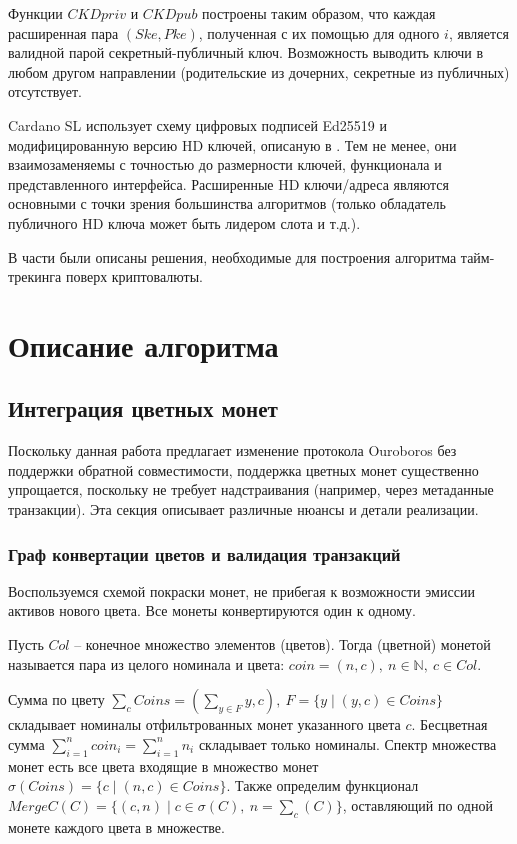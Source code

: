 \documentclass[specification,annotation]{itmo-student-thesis}
\begin{document}
Функции $CKDpriv$ и $CKDpub$ построены таким образом, что каждая
расширенная пара $(Ske,Pke)$, полученная с их помощью для одного $i$,
является валидной парой секретный-публичный ключ. Возможность выводить
ключи в любом другом направлении (родительские из дочерних, секретные
из публичных) отсутствует.

Cardano SL использует схему цифровых подписей Ed25519
\cite{bernstein2012high} и модифицированную версию HD ключей, описаную
в \cite{ed25519hd}. Тем не менее, они взаимозаменяемы с точностью до
размерности ключей, функционала и представленного
интерфейса. Расширенные HD ключи/адреса являются основными с точки
зрения большинства алгоритмов (только обладатель публичного HD ключа
может быть лидером слота и т.д.).

\chapterconclusion

В части были описаны решения, необходимые для построения алгоритма
тайм-трекинга поверх криптовалюты.

\chapter{Описание алгоритма}

\section{Интеграция цветных монет}

Поскольку данная работа предлагает изменение протокола Ouroboros без
поддержки обратной совместимости, поддержка цветных монет существенно
упрощается, поскольку не требует надстраивания (например, через
метаданные транзакции). Эта секция описывает различные нюансы и детали
реализации.

\subsection{Граф конвертации цветов и валидация транзакций}

Воспользуемся схемой покраски монет, не прибегая к возможности эмиссии
активов нового цвета. Все монеты конвертируются один к одному.

\begin{definition}
Пусть $Col$ -- конечное множество элементов (цветов). Тогда (цветной)
монетой называется пара из целого номинала и цвета: $coin = (n,c), \ n
\in \mathbb{N}, \ c \in Col$.
\end{definition}

Сумма по цвету $\sum_c{Coins} = (\sum_{y \in F}{y}, c), \ F = \{y \mid
(y,c) \in Coins\}$ складывает номиналы отфильтрованных монет
указанного цвета $c$. Бесцветная сумма $\sum_{i=1}^n{coin_i} =
\sum_{i=1}^n{n_i}$ складывает только номиналы. Спектр множества монет
есть все цвета входящие в множество монет $\sigma(Coins) = \{c \mid
(n,c) \in Coins\}$. Также определим функционал $MergeC(C) = \{(c,n)
\mid c \in \sigma(C), \ n = \sum_c(C)\}$, оставляющий по одной монете
каждого цвета в множестве.
\end{document}
